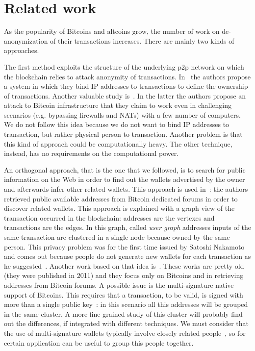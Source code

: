 \section{Related work} \label{relworks}
As the popularity of Bitcoins and altcoins grow, the number of work on
de-anonymization of their transactions increases.
There are mainly two kinds of approaches.

The first method exploits the structure of the underlying p2p network on which
the blockchain relies to attack anonymity of transactions.
In~\cite{bib:anonBitcoin} the authors propose a system in which they bind IP
addresses to transactions to define the ownership of transactions. Another
valuable study is~\cite{bib:deanonP2P}. In the latter the authors propose an
attack to Bitcoin infrastructure that they claim to work even in challenging
scenarios (e.g. bypassing firewalls and NATs) with a few number of computers.
We do not follow this idea because we do not want to bind IP addresses to
transaction, but rather physical person to transaction. Another problem is that
this kind of approach could be computationally heavy. The other technique,
instead, has no requirements on the computational power.

An orthogonal approach, that is the one that we followed, is to search for
public information on the Web in order to find out the wallets advertised
by the owner and afterwards infer other related wallets. This approach is used
in~\cite{bib:anonAnalysis}: the authors retrieved public available addresses
from Bitcoin dedicated forums in order to discover related wallets. This
approach is explained with a graph view of the transaction occurred in the
blockchain: addresses are the vertexes and transactions are the edges. In this
graph, called \textit{user graph} addresses inputs of the same transaction are
clustered in a single node because owned by the same person. This privacy
problem was for the first time issued by Satoshi Nakamoto and comes out
because people do not generate new wallets for each transaction as he
suggested~\cite{bib:satoshi}. Another work based on that idea
is~\cite{bib:fistful}.
These works are pretty old (they were published in 2011) and they focus only on
Bitcoins and in retrieving addresses from Bitcoin forums. A possible issue is
the multi-signature native support of Bitcoins. This requires that a
transaction, to be valid, is signed with more than a single public
key~\cite{bib:multisignature}: in this scenario all this addresses will be
grouped in the same cluster. A more fine grained study of this cluster will
probably find out the differences, if integrated with different techniques. We
must consider that the use of multi-signature wallets typically involve closely
related people~\cite{bib:multisignaturebitcoinwiki}, so for certain application
can be useful to group this people together.

